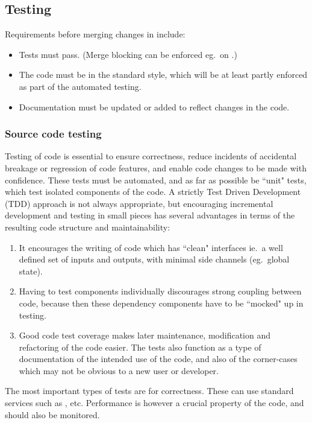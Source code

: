\subsection{Testing} \label{sec:test}

Requirements before merging changes in  include:
\begin{itemize}
\item Tests must pass. (Merge blocking can be enforced eg.\ on .)
\item The code must be in the standard style, which will be at least
partly enforced as part of the automated testing.
\item Documentation must be updated or added to reflect changes in the code.
\end{itemize}

\subsubsection{Source code testing} \label{sec:source}

Testing of code is essential to ensure correctness, reduce incidents
of accidental breakage or regression of code features, and enable code
changes to be made with confidence. These tests must be automated, and
as far as possible be ``unit" tests, which test isolated components of
the code. A strictly Test Driven Development (TDD) approach is not
always appropriate, but encouraging incremental development and
testing in small pieces has several advantages in terms of the
resulting code structure and maintainability:

\begin{enumerate}
\item It encourages the writing of code which has ``clean" interfaces ie.\ 
a well defined set of inputs and outputs, with minimal side channels (eg.\ 
global state).
\item Having to test components individually discourages strong coupling
between code, because then these dependency components have to be
``mocked" up in testing.
\item Good code test coverage makes later maintenance, modification and refactoring
of the code easier. The tests also function as a type of documentation
of the intended use of the code, and also of the corner-cases which may not
be obvious to a new user or developer.
\end{enumerate}

The most important types of tests are for correctness. These can use standard
services such as ,  etc. Performance is however
a crucial property of the code, and should also be monitored.

